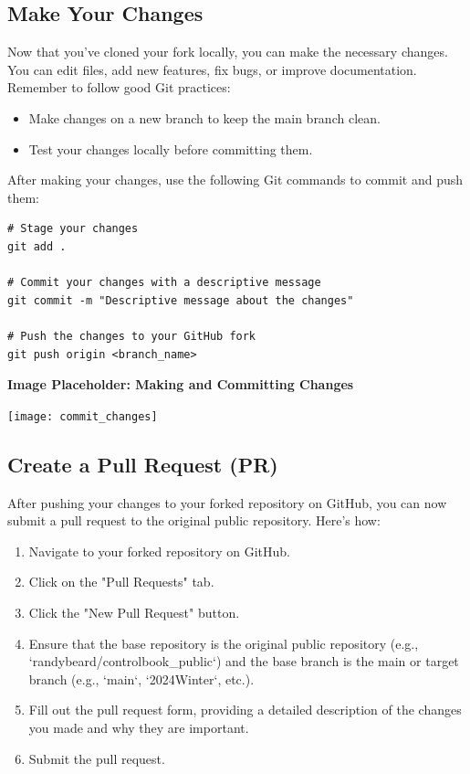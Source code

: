 \documentclass{article}
\begin{document}
\subsection{Make Your Changes}

Now that you've cloned your fork locally, you can make the necessary changes. You can edit files, add new features, fix bugs, or improve documentation. Remember to follow good Git practices:

\begin{itemize}
    \item Make changes on a new branch to keep the main branch clean.
    \item Test your changes locally before committing them.
\end{itemize}

After making your changes, use the following Git commands to commit and push them:

\begin{verbatim}
# Stage your changes
git add .

# Commit your changes with a descriptive message
git commit -m "Descriptive message about the changes"

# Push the changes to your GitHub fork
git push origin <branch_name>
\end{verbatim}

\noindent \textbf{Image Placeholder: Making and Committing Changes}  
\begin{center}
    \texttt{[image: commit\_changes]} %
\end{center}

\subsection{Create a Pull Request (PR)}

After pushing your changes to your forked repository on GitHub, you can now submit a pull request to the original public repository. Here's how:

\begin{enumerate}
    \item Navigate to your forked repository on GitHub.
    \item Click on the "Pull Requests" tab.
    \item Click the "New Pull Request" button.
    \item Ensure that the base repository is the original public repository (e.g., `randybeard/controlbook\_public`) and the base branch is the main or target branch (e.g., `main`, `2024Winter`, etc.).
    \item Fill out the pull request form, providing a detailed description of the changes you made and why they are important.
    \item Submit the pull request.
\end{enumerate}
\end{document}
